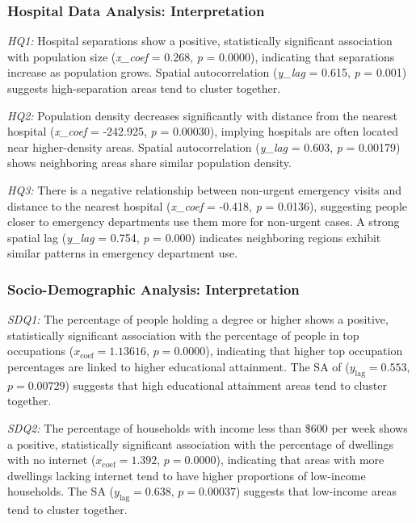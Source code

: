 \documentclass[
	a4paper, %
	10pt, %
	unnumberedsections, %
	twoside, %
]{LTJournalArticle}
\begin{document}
\subsubsection{Hospital Data Analysis: Interpretation}\leavevmode

\textit{HQ1:} Hospital separations show a positive, statistically significant association with population size (\textit{x\_coef} = 0.268, \textit{p} = 0.0000), indicating that separations increase as population grows. Spatial autocorrelation (\textit{y\_lag} = 0.615, \textit{p} = 0.001) suggests high-separation areas tend to cluster together.

\textit{HQ2:} Population density decreases significantly with distance from the nearest hospital (\textit{x\_coef} = -242.925, \textit{p} = 0.00030), implying hospitals are often located near higher-density areas. Spatial autocorrelation (\textit{y\_lag} = 0.603, \textit{p} = 0.00179) shows neighboring areas share similar population density.

\textit{HQ3:} There is a negative relationship between non-urgent emergency visits and distance to the nearest hospital (\textit{x\_coef} = -0.418, \textit{p} = 0.0136), suggesting people closer to emergency departments use them more for non-urgent cases. A strong spatial lag (\textit{y\_lag} = 0.754, \textit{p} = 0.000) indicates neighboring regions exhibit similar patterns in emergency department use.


\subsubsection{Socio-Demographic Analysis: Interpretation}\leavevmode

\textit{SDQ1:} The percentage of people holding a degree or higher shows a positive, statistically significant association with the percentage of people in top occupations ($x_{\text{coef}} = 1.13616$, $p = 0.0000$), indicating that higher top occupation percentages are linked to higher educational attainment. The SA of ($y_{\text{lag}} = 0.553$, $p = 0.00729$) suggests that high educational attainment areas tend to cluster together.

\textit{SDQ2:} The percentage of households with income less than \$600 per week shows a positive, statistically significant association with the percentage of dwellings with no internet ($x_{\text{coef}} = 1.392$, $p = 0.0000$), indicating that areas with more dwellings lacking internet tend to have higher proportions of low-income households. The SA ($y_{\text{lag}} = 0.638$, $p = 0.00037$) suggests that low-income areas tend to cluster together.
\end{document}
